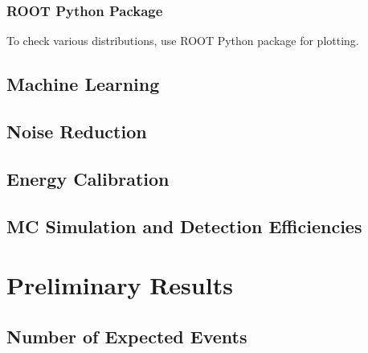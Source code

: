 \documentclass[12pt,twoside,letterpaper]{article}
\begin{document}
\subsubsection{ROOT Python Package}
To check various distributions, use ROOT Python package for plotting.


\subsection{Machine Learning} 

\subsection{Noise Reduction} 

\subsection{Energy Calibration} 

\subsection{MC Simulation and Detection Efficiencies} 

\section{Preliminary Results} 

\subsection{Number of Expected Events} 
\end{document}
